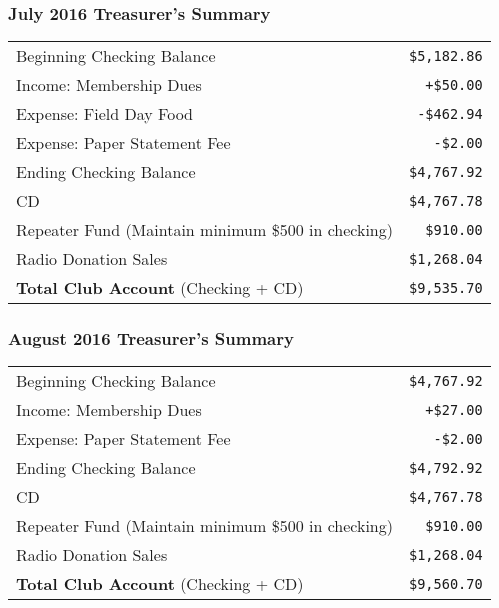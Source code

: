 \documentclass[10pt,letterpaper]{article}
\begin{document}
\subsubsection{July 2016 Treasurer's Summary}
\noindent
\begin{tabular}{|l|r|}
  \hline
  Beginning Checking Balance & \texttt{\$5,182.86} \\
  Income: Membership Dues & \texttt{+\$50.00} \\
  Expense: Field Day Food & \texttt{-\$462.94} \\
  Expense: Paper Statement Fee & \texttt{-\$2.00} \\
  Ending Checking Balance & \texttt{\$4,767.92} \\
  \hline
  \hline
  CD & \texttt{\$4,767.78} \\
  \hline
  \hline
  Repeater Fund (Maintain minimum \$500 in checking) & \texttt{\$910.00} \\
  \hline
  \hline
  Radio Donation Sales & \texttt{\$1,268.04} \\
  \hline
  \hline
  \textbf{Total Club Account} (Checking + CD) & \texttt{\$9,535.70} \\
  \hline
\end{tabular}

\subsubsection{August 2016 Treasurer's Summary}
\noindent
\begin{tabular}{|l|r|}
  \hline
  Beginning Checking Balance & \texttt{\$4,767.92} \\
  Income: Membership Dues & \texttt{+\$27.00} \\
  Expense: Paper Statement Fee & \texttt{-\$2.00} \\
  Ending Checking Balance & \texttt{\$4,792.92} \\
  \hline
  \hline
  CD & \texttt{\$4,767.78} \\
  \hline
  \hline
  Repeater Fund (Maintain minimum \$500 in checking) & \texttt{\$910.00} \\
  \hline
  \hline
  Radio Donation Sales & \texttt{\$1,268.04} \\
  \hline
  \hline
  \textbf{Total Club Account} (Checking + CD) & \texttt{\$9,560.70} \\
  \hline
\end{tabular}
\end{document}
